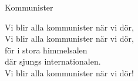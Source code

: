 \begin{song}{Kommunister}
	
	
	
	
	Vi blir alla kommunister när vi dör,\\
	Vi blir alla kommunister när vi dör,\\
	för i stora himmelsalen\\
	där sjungs internationalen.\\
	Vi blir alla kommunister när vi dör!

	
\end{song}
